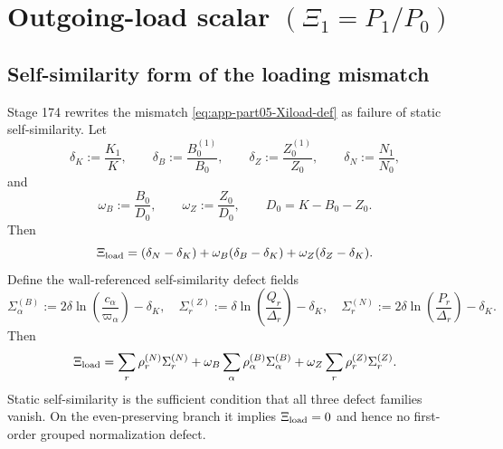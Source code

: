 
\section{Outgoing-load scalar \texorpdfstring{\((\Xi_1=P_1/P_0)\)}{(Xi1=P1/P0)}}
\label{sec:app-part05_weak_axisymmetric_orbit:outgoing-load-scalar-xi-1-p-1-p-0}

\subsection{Self-similarity form of the loading mismatch}
Stage 174 rewrites the mismatch \eqref{eq:app-part05-Xiload-def} as failure of static self-similarity.  Let
\begin{equation}
\label{eq:app-part05-static-slope-defs}
\delta_K:=\frac{K_1}{K},
\qquad
\delta_B:=\frac{B_0^{(1)}}{B_0},
\qquad
\delta_Z:=\frac{Z_0^{(1)}}{Z_0},
\qquad
\delta_N:=\frac{N_1}{N_0},
\end{equation}
and
\begin{equation}
\label{eq:app-part05-weights-static}
\omega_B:=\frac{B_0}{D_0},
\qquad
\omega_Z:=\frac{Z_0}{D_0},
\qquad
D_0=K-B_0-Z_0.
\end{equation}
Then
\begin{equation}
\label{eq:app-part05-Xiload-selfsimilarity}
\Xi_{\rm load}
=
(\delta_N-\delta_K)
+\omega_B(\delta_B-\delta_K)
+\omega_Z(\delta_Z-\delta_K).
\end{equation}
Define the wall-referenced self-similarity defect fields
\begin{equation}
\label{eq:app-part05-Sigma-self-fields}
\Sigma_\alpha^{(B)}:=2\delta\ln\!\left(\frac{c_\alpha}{\varpi_\alpha}\right)-\delta_K,
\quad
\Sigma_r^{(Z)}:=\delta\ln\!\left(\frac{Q_r}{\Delta_r}\right)-\delta_K,
\quad
\Sigma_r^{(N)}:=2\delta\ln\!\left(\frac{P_r}{\Delta_r}\right)-\delta_K.
\end{equation}
Then
\begin{equation}
\label{eq:app-part05-Xiload-Sigma-fields}
\Xi_{\rm load}
=
\sum_r\rho_r^{(N)}\Sigma_r^{(N)}
+
\omega_B\sum_\alpha\rho_\alpha^{(B)}\Sigma_\alpha^{(B)}
+
\omega_Z\sum_r\rho_r^{(Z)}\Sigma_r^{(Z)}.
\end{equation}
Static self-similarity is the sufficient condition that all three defect families vanish.  On the even-preserving branch it implies \(\Xi_{\rm load}=0\) and hence no first-order grouped normalization defect.

